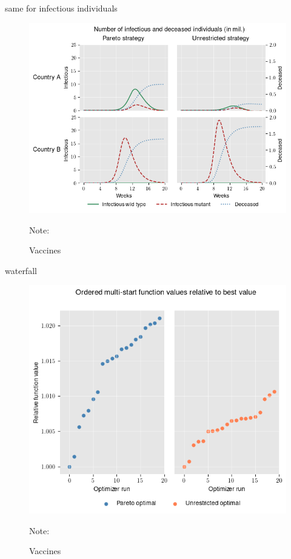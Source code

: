 same for infectious individuals
\begin{figure}[h!]
\centering
\includegraphics[scale=0.8]{images/piecewise_infectious_dead.png}\\
\begin{flushleft}
\scriptsize{Note:}
\end{flushleft}
\caption{Vaccines}
\label{fig:results_piecewise_infectious_dead}
\end{figure}


waterfall
\begin{figure}[h!]
\centering
\includegraphics[scale=0.6]{images/piecewise_waterfall.png}\\
\begin{flushleft}
\scriptsize{Note:}
\end{flushleft}
\caption{Vaccines}
\label{fig:results_piecewise_waterfall}
\end{figure}


